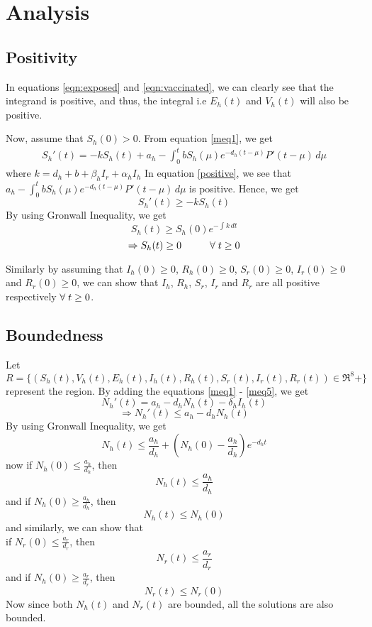 \chapter{Analysis}

\section{Positivity}
In equations \ref{eqn:exposed} and \ref{eqn:vaccinated}, we can clearly see that the integrand is positive, and thus, the integral i.e $E_{h}(t)$ and $V_{h}(t)$ will also be positive.

Now, assume that $S_{h}(0)>0$. From equation \ref{meq1}, we get
\begin{align}
S_{h}'(t) = -kS_{h}(t)+a_{h}-\int_{0}^{t} bS_{h}(\mu)e^{-d_{h}(t-\mu)}P'(t-\mu) \,d\mu \label{positive}
\end{align}
where $ k = d_{h}+b+\beta_{h}I_{r}+\alpha_{h}I_{h} $
In equation \ref{positive}, we see that $a_{h}-\int_{0}^{t} bS_{h}(\mu)e^{-d_{h}(t-\mu)}P'(t-\mu) \,d\mu$ is positive. Hence, we get
\[S_{h}'(t)\geq-kS_{h}(t)\]
By using Gronwall Inequality, we get
\[S_{h}(t) \geq S_{h}(0)e^{-\int_{}^{} k \,dt}\]
\[\Rightarrow S_{h}(t) \geq 0 \hspace{10mm} \forall \hspace{1mm} t \geq 0\]

Similarly by assuming that $I_{h}(0) \geq 0$, $R_{h}(0) \geq 0$, $S_{r}(0) \geq 0$, $I_{r}(0) \geq 0$ and $R_{r}(0) \geq 0$, we can show that $I_{h}$, $R_{h}$, $S_{r}$, $I_{r}$ and $R_{r}$ are all positive respectively $\forall \hspace{1mm} t \geq 0$.

\section{Boundedness}
Let $R = \lbrace(S_{h}(t), V_{h}(t), E_{h}(t), I_{h}(t), R_{h}(t), S_{r}(t), I_{r}(t), R_{r}(t)) \in \Re^8+\rbrace$ represent the region. By adding the equations \ref{meq1} - \ref{meq5}, we get
\[N_{h}'(t) = a_{h}-d_{h}N_{h}(t)-\delta_{h}I_{h}(t)\]
\[\Rightarrow N_{h}'(t) \leq a_{h}-d_{h}N_{h}(t)\]
By using Gronwall Inequality, we get
\[N_{h}(t) \leq \frac{a_{h}}{d_{h}} + (N_{h}(0)-\frac{a_{h}}{d_{h}})e^{-d_{h}t}\]
now if $N_{h}(0) \leq \frac{a_{h}}{d_{h}}$, then
\[N_{h}(t) \leq \frac{a_{h}}{d_{h}}\]
and if $N_{h}(0) \geq \frac{a_{h}}{d_{h}}$, then
\[N_{h}(t) \leq N_{h}(0)\]
and similarly, we can show that\\
if $N_{r}(0) \leq \frac{a_{r}}{d_{r}}$, then
\[N_{r}(t) \leq \frac{a_{r}}{d_{r}}\]
and if $N_{h}(0) \geq \frac{a_{r}}{d_{r}}$, then
\[N_{r}(t) \leq N_{r}(0)\]
Now since both $N_{h}(t)$ and $N_{r}(t)$ are bounded, all the solutions are also bounded.

